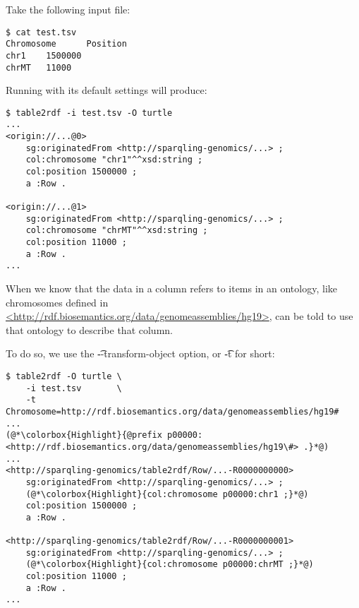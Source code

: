   Take the following input file:
\begin{siderules}
\begin{verbatim}
$ cat test.tsv
Chromosome      Position
chr1    1500000
chrMT   11000
\end{verbatim}
\end{siderules}

  Running  with its default settings will produce:

\begin{siderules}
\begin{verbatim}
$ table2rdf -i test.tsv -O turtle
...
<origin://...@0>
    sg:originatedFrom <http://sparqling-genomics/...> ;
    col:chromosome "chr1"^^xsd:string ;
    col:position 1500000 ;
    a :Row .

<origin://...@1>
    sg:originatedFrom <http://sparqling-genomics/...> ;
    col:chromosome "chrMT"^^xsd:string ;
    col:position 11000 ;
    a :Row .
...
\end{verbatim}
\end{siderules}

  \begin{sloppypar}
  When we know that the data in a column refers to items in an ontology, like
  chromosomes defined in
  \href{http://rdf.biosemantics.org/data/genomeassemblies/hg19}%
  {<http://rdf.biosemantics.org/data/genomeassemblies/hg19>}, 
  can be told to use that ontology to describe that column.
  \end{sloppypar}

  To do so, we use the \t{-{}-transform-object} option, or \t{-t}
  for short:

\begin{siderules}
\begin{lstlisting}
$ table2rdf -O turtle \
    -i test.tsv       \
    -t Chromosome=http://rdf.biosemantics.org/data/genomeassemblies/hg19#
...
(@*\colorbox{Highlight}{@prefix p00000: <http://rdf.biosemantics.org/data/genomeassemblies/hg19\#> .}*@)
...
<http://sparqling-genomics/table2rdf/Row/...-R0000000000>
    sg:originatedFrom <http://sparqling-genomics/...> ;
    (@*\colorbox{Highlight}{col:chromosome p00000:chr1 ;}*@)
    col:position 1500000 ;
    a :Row .

<http://sparqling-genomics/table2rdf/Row/...-R0000000001>
    sg:originatedFrom <http://sparqling-genomics/...> ;
    (@*\colorbox{Highlight}{col:chromosome p00000:chrMT ;}*@)
    col:position 11000 ;
    a :Row .
...
\end{lstlisting}
\end{siderules}

